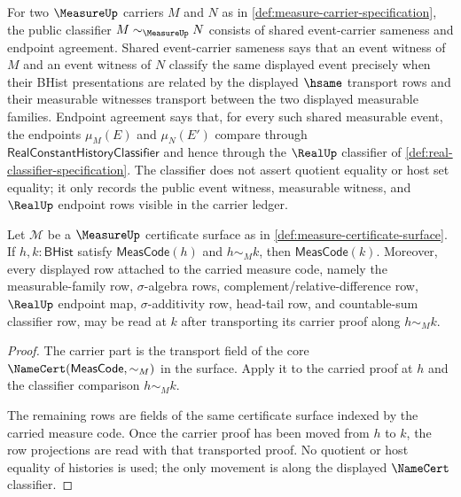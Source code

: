 \begin{definition}
\label{def:measure-classifier-specification}
For two $\MeasureUp$ carriers $M$ and $N$ as in \autoref{def:measure-carrier-specification}, the public classifier $M\sim_{\MeasureUp}N$ consists of shared event-carrier sameness and endpoint agreement. Shared event-carrier sameness says that an event witness of $M$ and an event witness of $N$ classify the same displayed event precisely when their BHist presentations are related by the displayed $\hsame$ transport rows and their measurable witnesses transport between the two displayed measurable families. Endpoint agreement says that, for every such shared measurable event, the endpoints $\mu_M(E)$ and $\mu_N(E')$ compare through $\mathsf{RealConstantHistoryClassifier}$ and hence through the $\RealUp$ classifier of \autoref{def:real-classifier-specification}. The classifier does not assert quotient equality or host set equality; it only records the public event witness, measurable witness, and $\RealUp$ endpoint rows visible in the carrier ledger.
\end{definition}

\begin{theorem}
\label{thm:measure-obligation-carrier-transport}
Let $\mathcal{M}$ be a $\MeasureUp$ certificate surface as in \autoref{def:measure-certificate-surface}. If $h,k:\mathsf{BHist}$ satisfy $\mathsf{MeasCode}(h)$ and $h\sim_M k$, then $\mathsf{MeasCode}(k)$. Moreover, every displayed row attached to the carried measure code, namely the measurable-family row, $\sigma$-algebra rows, complement/relative-difference row, $\RealUp$ endpoint map, $\sigma$-additivity row, head-tail row, and countable-sum classifier row, may be read at $k$ after transporting its carrier proof along $h\sim_M k$.
\end{theorem}
\begin{proof}
The carrier part is the transport field of the core $\NameCert(\mathsf{MeasCode},\sim_M)$ in the surface. Apply it to the carried proof at $h$ and the classifier comparison $h\sim_M k$.

The remaining rows are fields of the same certificate surface indexed by the carried measure code. Once the carrier proof has been moved from $h$ to $k$, the row projections are read with that transported proof. No quotient or host equality of histories is used; the only movement is along the displayed $\NameCert$ classifier.
\end{proof}

